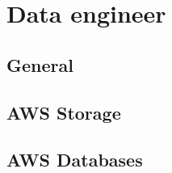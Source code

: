 \documentclass{book}
\begin{document}
\tableofcontents

\chapter{Data engineer}

\section{General}

\newpage
\section{AWS Storage}

\newpage
\section{AWS Databases}

\newpage
\end{document}
